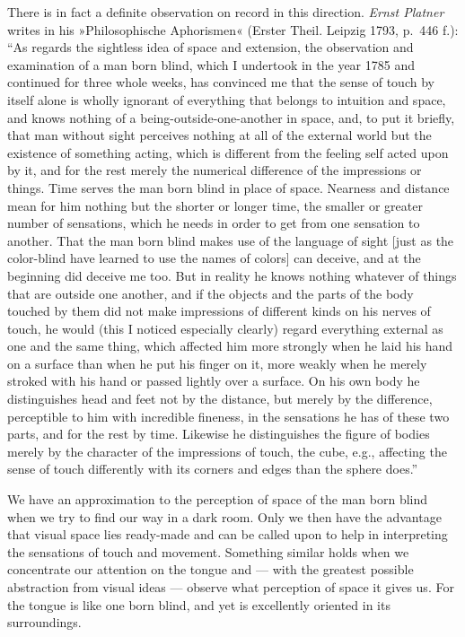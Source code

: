 \documentclass[12pt,a4paper]{book}
\newcommand{\opage}[1]{\marginnote{\footnotesize\textit{[#1]}}}
\begin{document}
There is in fact a definite observation on record in this direction.
\emph{Ernst Platner} writes in his »Philosophische Aphorismen« (Erster
Theil. Leipzig 1793, p.~446 f.): ``As regards the sightless idea of space
and extension, the observation and examination of a man born blind,
which I undertook in the year 1785 and continued for three whole weeks,
has convinced me that the sense of touch by itself alone is wholly
ignorant of everything that belongs to intuition and space, and knows
nothing of a being-outside-one-another in space, and, to put it briefly,
that man without sight perceives nothing at all of the external world
but the existence of something acting, which is different from the
feeling self acted upon by it, and for the rest merely the numerical
difference of the impressions or things. Time serves the man born blind
in place of space. Nearness and distance
\opage{242}mean for him nothing but the shorter or longer time, the
smaller or greater number of sensations, which he needs in order to get
from one sensation to another. That the man born blind makes use of the
language of sight [just as the color-blind have learned to use the names
of colors] can deceive, and at the beginning did deceive me too. But in
reality he knows nothing whatever of things that are outside one
another, and if the objects and the parts of the body touched by them did
not make impressions of different kinds on his nerves of touch, he would
(this I noticed especially clearly) regard everything external as one
and the same thing, which affected him more strongly when he laid his
hand on a surface than when he put his finger on it, more weakly when he
merely stroked with his hand or passed lightly over a surface. On his
own body he distinguishes head and feet not by the distance, but merely
by the difference, perceptible to him with incredible fineness, in the
sensations he has of these two parts, and for the rest by time.
Likewise he distinguishes the figure of bodies merely by the character
of the impressions of touch, the cube, e.g., affecting the sense of touch
differently with its corners and edges than the sphere does.''

We have an approximation to the perception of space of the man born
blind when we try to find our way in a dark room. Only we then have the
advantage that visual space lies ready-made and can be called upon to
help in interpreting the sensations of touch and movement. Something
similar holds when we concentrate our attention on the tongue and ---
with the greatest possible abstraction from visual ideas --- observe
what perception of space it gives us. For the tongue is like one born
blind, and yet is excellently oriented in its surroundings.
\end{document}
